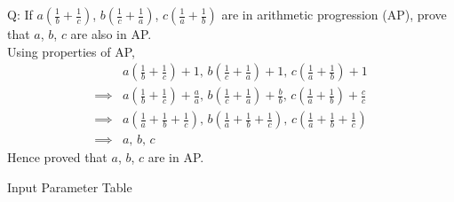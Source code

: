 \documentclass[journal,12pt,onecolumn]{IEEEtran}
\theoremstyle{remark}
\begin{document}
\let\vec\mathbf







\bigskip


Q: If $a\left(\frac{1}{b} + \frac{1}{c}\right)$, $b\left(\frac{1}{c} + \frac{1}{a}\right)$, $c\left(\frac{1}{a} + \frac{1}{b}\right)$ are in arithmetic progression (AP), prove that $a$, $b$, $c$ are also in AP. \\


\solution
Using properties of AP,
\begin{align}
&a\left(\frac{1}{b} + \frac{1}{c}\right) + 1, \, b\left(\frac{1}{c} + \frac{1}{a}\right) + 1, \, c\left(\frac{1}{a} + \frac{1}{b}\right) + 1 \nonumber \\ \implies
&a\left(\frac{1}{b} + \frac{1}{c}\right) + \frac{a}{a}, \, b\left(\frac{1}{c} + \frac{1}{a}\right) + \frac{b}{b}, \, c\left(\frac{1}{a} + \frac{1}{b}\right) + \frac{c}{c} \nonumber \\ \implies
&a\left(\frac{1}{a} + \frac{1}{b} + \frac{1}{c}\right), \, b\left(\frac{1}{a} + \frac{1}{b} + \frac{1}{c}\right), \, c\left(\frac{1}{a} + \frac{1}{b} + \frac{1}{c}\right) \nonumber \\ \implies
&a, \, b, \, c \nonumber
\end{align}
Hence proved that $a$, $b$, $c$ are in AP. \\

\begin{table}[!h]

\caption{Input Parameter Table}
\label{tab:11.9.5.16.tab1}
\end{table}
\end{document}
